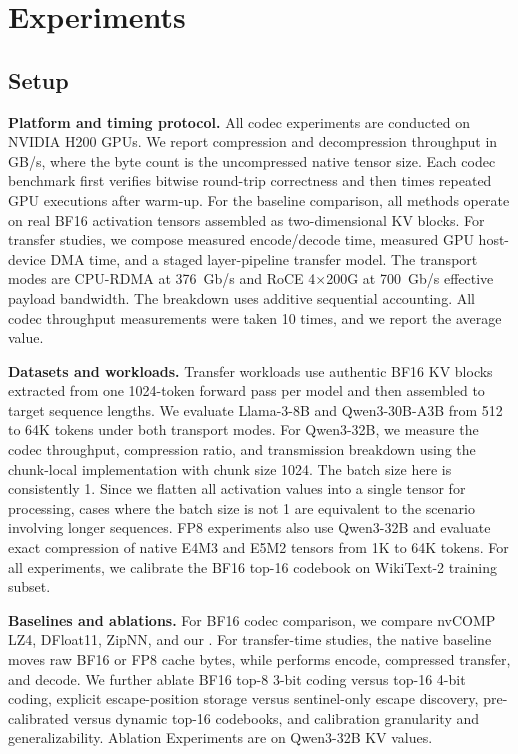 \section{Experiments}
\label{sec:experiments}

\subsection{Setup}
    \label{sec:setup}

    \textbf{Platform and timing protocol.}
    All codec experiments are conducted on NVIDIA H200 GPUs. We report compression and decompression throughput in GB/s, where the byte count is the uncompressed native tensor size. Each codec benchmark first verifies bitwise round-trip correctness and then times repeated GPU executions after warm-up. For the baseline comparison, all methods operate on real BF16 activation tensors assembled as two-dimensional KV blocks. For transfer studies, we compose measured \splitzip encode/decode time, measured GPU host-device DMA time, and a staged layer-pipeline transfer model. The transport modes are CPU-RDMA at 376~Gb/s and RoCE 4$\times$200G at 700~Gb/s effective payload bandwidth. The breakdown uses additive sequential accounting. All codec throughput measurements were taken 10 times, and we report the average value.
    
    \textbf{Datasets and workloads.}
    Transfer workloads use authentic BF16 KV blocks extracted from one 1024-token forward pass per model and then assembled to target sequence lengths. We evaluate Llama-3-8B and Qwen3-30B-A3B from 512 to 64K tokens under both transport modes. For Qwen3-32B, we measure the codec throughput, compression ratio, and transmission breakdown using the chunk-local implementation with chunk size 1024. The batch size here is consistently 1. Since we flatten all activation values into a single tensor for processing, cases where the batch size is not 1 are equivalent to the scenario involving longer sequences. FP8 experiments also use Qwen3-32B and evaluate exact compression of native E4M3 and E5M2 tensors from 1K to 64K tokens. For all experiments, we calibrate the BF16 top-16 codebook on WikiText-2\cite{merity2016wikitext2} training subset.
    
    \textbf{Baselines and ablations.}
    For BF16 codec comparison, we compare nvCOMP LZ4\cite{nvidia2026nvcomp}, DFloat11\cite{dfloat11}, ZipNN\cite{zipnn}, and our \splitzip. For transfer-time studies, the native baseline moves raw BF16 or FP8 cache bytes, while \splitzip performs encode, compressed transfer, and decode. We further ablate BF16 top-8 3-bit coding versus top-16 4-bit coding, explicit escape-position storage versus sentinel-only escape discovery, pre-calibrated versus dynamic top-16 codebooks, and calibration granularity and generalizability. Ablation Experiments are on Qwen3-32B KV values.



